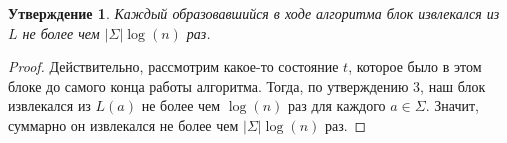 \documentclass{article}
\newtheorem{statement}{Утверждение}
\begin{document}
\begin{statement}
    Каждый образовавшийся в ходе алгоритма блок извлекался из $L$ не более чем $|\Sigma| \log(n)$ раз.
\end{statement}
\begin{proof}
    Действительно, рассмотрим какое-то состояние $t$, которое было в этом блоке до самого конца работы алгоритма. Тогда, по утверждению 3, наш блок извлекался из $L(a)$ не более чем $\log(n)$ раз для каждого $a \in \Sigma$. Значит, суммарно он извлекался не более чем $|\Sigma| \log(n)$ раз.
\end{proof}

\end{document}
